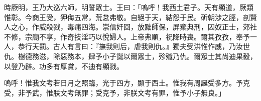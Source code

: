 
\begin{pinyinscope}
時厥明，王乃大巡六師，明誓眾士。王曰：「嗚呼！我西土君子。天有顯道，厥類惟彰。今商王受，狎侮五常，荒怠弗敬。自絕于天，結怨于民。斫朝涉之脛，剖賢人之心，作威殺戮，毒痡四海。崇信奸回，放黜師保，屏棄典刑，囚奴正士，郊社不修，宗廟不享，作奇技淫巧以悅婦人。上帝弗順，祝降時喪。爾其孜孜，奉予一人，恭行天罰。古人有言曰：『撫我則后，虐我則仇。』獨夫受洪惟作威，乃汝世仇。樹德務滋，除惡務本，肆予小子誕以爾眾士，殄殲乃仇。爾眾士其尚迪果毅，以登乃辟。功多有厚賞，不迪有顯戮。

嗚呼！惟我文考若日月之照臨，光于四方，顯于西土。惟我有周誕受多方。予克受，非予武，惟朕文考無罪；受克予，非朕文考有罪，惟予小子無良。」


\end{pinyinscope}